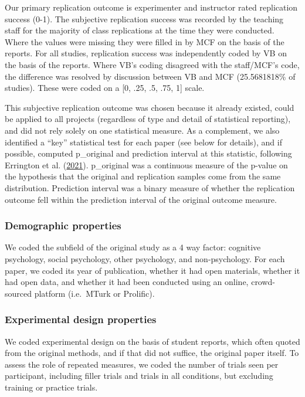 \documentclass[
  english,
  a4paper,
]{article}
\begin{document}
Our primary replication outcome is experimenter and instructor rated replication success (0-1). The subjective replication success was recorded by the teaching staff for the majority of class replications at the time they were conducted. Where the values were missing they were filled in by MCF on the basis of the reports. For all studies, replication success was independently coded by VB on the basis of the reports. Where VB's coding disagreed with the staff/MCF's code, the difference was resolved by discussion between VB and MCF (25.5681818\% of studies). These were coded on a {[}0, .25, .5, .75, 1{]} scale.

This subjective replication outcome was chosen because it already existed, could be applied to all projects (regardless of type and detail of statistical reporting), and did not rely solely on one statistical measure. As a complement, we also identified a ``key'' statistical test for each paper (see below for details), and if possible, computed p\_original and prediction interval at this statistic, following Errington et al. (\protect\hyperlink{ref-errington2021}{2021}). p\_original was a continuous measure of the p-value on the hypothesis that the original and replication samples come from the same distribution. Prediction interval was a binary measure of whether the replication outcome fell within the prediction interval of the original outcome measure.

\hypertarget{demographic-properties}{%
\subsubsection{Demographic properties}\label{demographic-properties}}

We coded the subfield of the original study as a 4 way factor: cognitive psychology, social psychology, other psychology, and non-psychology. For each paper, we coded its year of publication, whether it had open materials, whether it had open data, and whether it had been conducted using an online, crowd-sourced platform (i.e.~MTurk or Prolific).

\hypertarget{experimental-design-properties}{%
\subsubsection{Experimental design properties}\label{experimental-design-properties}}

We coded experimental design on the basis of student reports, which often quoted from the original methods, and if that did not suffice, the original paper itself. To assess the role of repeated measures, we coded the number of trials seen per participant, including filler trials and trials in all conditions, but excluding training or practice trials.
\end{document}
